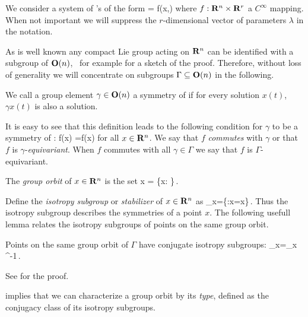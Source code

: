 \renewcommand{\inputfile}{\version\ - edited 2007-03-11 symODEs}

We consider a system of \ode's of the form
\beq
	 = f(x,\lambda)
	\label{eq:dynsys}
\eeq
where $f: \mathbf{R}^{n}\times\mathbf{R}^{r}$ a $C^\infty$ mapping. When
not important we will suppress the $r$-dimensional vector of parameters
$\lambda$ in the notation.

As is well known any compact Lie group acting on $\mathbf{R}^{n}$ can be identified
with a subgroup of $\mathbf{O}(n)$, \cf\ for example 
for a sketch of the proof. Therefore, without loss of generality
we will concentrate on subgroups $\Gamma\subseteq\mathbf{O}(n)$ in the following.

\begin{definition}
We call a group element $\gamma\in\mathbf{O}(n)$ a symmetry of  if for every solution
$x(t)$, $\gamma x(t)$ is also a solution.
\end{definition}

It is easy to see that this definition leads to the following condition for $\gamma$ to
be a symmetry of :
\beq
	f(\gamma x) =\gamma f(x)
	\label{eq:equiv}
\eeq
for all $x\in\mathbf{R}^{n}$. We say that $f$ \emph{commutes} with $\gamma$ or that $f$ is $\gamma$-\emph{equivariant}.
When $f$ commutes with all $\gamma\in\Gamma$ we say that $f$ is $\Gamma$-equivariant.


The \emph{group orbit} of $x\in\mathbf{R}^{n}$ is the set
\beq
	\Gamma x = \{\gamma x: \gamma\in\Gamma\}\,.
\eeq

Define the \emph{isotropy subgroup} or \emph{stabilizer} of $x\in\mathbf{R}^{n}$ as
\beq
	\Sigma_x=\{\gamma\in\Gamma:\gamma x=x\}\,.
\eeq
Thus the isotropy subgroup describes the symmetries of a point $x$. The following usefull lemma
relates the isotropy subgroups of points on the same group orbit.

\begin{lemma}
\label{lm:stabGorbit}
Points on the same group orbit of $\Gamma$ have conjugate isotropy subgroups:
\beq
	\Sigma_{\gamma x}=\gamma \Sigma_x \gamma^{-1}\,.
\eeq
\end{lemma}
See  for the proof.

 implies that we can characterize a group orbit by its \emph{type}, defined
as the conjugacy class of its isotropy subgroups.

